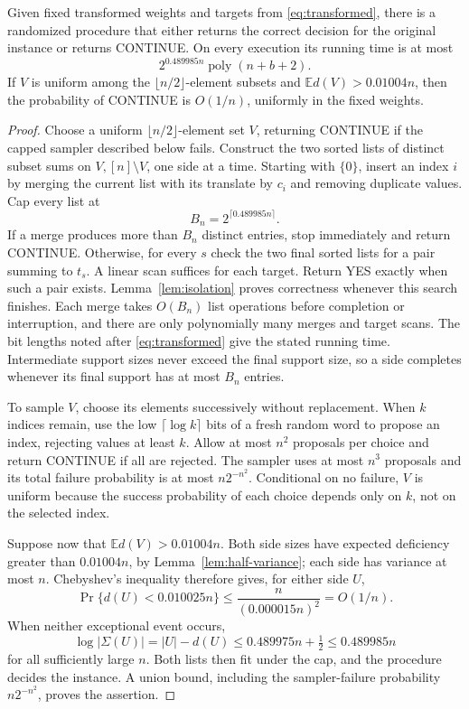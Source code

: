 \begin{proposition}
\label{prop:preliminary}
Given fixed transformed weights and targets from
\eqref{eq:transformed}, there is a randomized procedure that either
returns the correct decision for the original instance or returns
\textup{CONTINUE}.  On every execution its running time is at most
\[
 2^{0.489985n}\operatorname{poly}(n+b+2).
\]
If $V$ is uniform among the $\lfloor n/2\rfloor$-element subsets and
$\mathbb E d(V)>0.01004n$, then the probability of \textup{CONTINUE}
is $O(1/n)$, uniformly in the fixed weights.
\end{proposition}

\begin{proof}
Choose a uniform $\lfloor n/2\rfloor$-element set $V$, returning
\textup{CONTINUE} if the capped sampler described below fails.
Construct the two sorted lists of distinct subset sums on
$V,[n]\setminus V$, one side at a time.  Starting with $\{0\}$, insert an
index $i$ by merging the current list with its translate by $c_i$ and
removing duplicate values.  Cap every list at
\[
 B_n=2^{\lceil0.489985n\rceil}.
\]
If a merge produces more than $B_n$ distinct entries, stop immediately
and return \textup{CONTINUE}.  Otherwise, for every $s$ check the two
final sorted lists for a pair summing to $t_s$.  A linear scan suffices
for each target.  Return \textup{YES} exactly when such a pair exists.
Lemma~\ref{lem:isolation} proves correctness whenever this search
finishes.  Each merge takes $O(B_n)$ list operations before completion
or interruption, and there are only polynomially many merges and
target scans.  The bit lengths noted after \eqref{eq:transformed}
give the stated running time.  Intermediate support sizes never exceed
the final support size, so a side completes whenever its final support
has at most $B_n$ entries.

To sample $V$, choose its elements successively without replacement.
When $k$ indices remain, use the low $\lceil\log k\rceil$ bits of a
fresh random word to propose an index, rejecting values at least $k$.
Allow at most $n^2$ proposals per choice and return \textup{CONTINUE}
if all are rejected.  The sampler uses at most $n^3$ proposals and its
total failure probability is at most $n2^{-n^2}$.  Conditional on no
failure, $V$ is uniform because the success probability of each choice
depends only on $k$, not on the selected index.

Suppose now that $\mathbb E d(V)>0.01004n$.  Both side sizes have
expected deficiency greater than $0.01004n$, by
Lemma~\ref{lem:half-variance}; each side has variance at most $n$.
Chebyshev's inequality therefore gives, for either side $U$,
\[
 \Pr\{d(U)<0.010025n\}
 \le \frac{n}{(0.000015n)^2}=O(1/n).
\]
When neither exceptional event occurs,
\[
 \log|\Sigma(U)|=|U|-d(U)
 \le 0.489975n+\tfrac12
 \le 0.489985n
\]
for all sufficiently large $n$.  Both lists then fit under the cap,
and the procedure decides the instance.  A union bound, including the
sampler-failure probability $n2^{-n^2}$, proves the assertion.
\end{proof}

